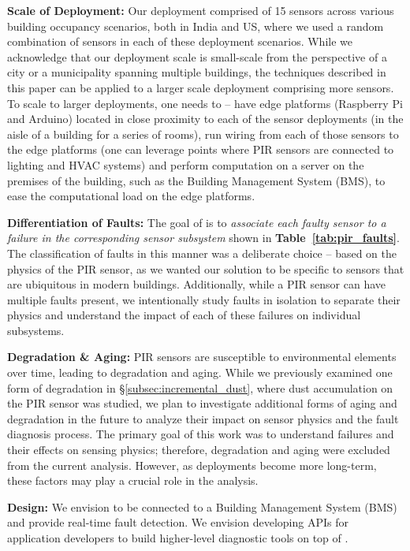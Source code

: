 \noindent \textbf{Scale of Deployment:} Our deployment comprised of 15 sensors across various building occupancy scenarios, both in India and US, where we used a random combination of sensors in each of these deployment scenarios. While we acknowledge that our deployment scale is small-scale from the perspective of a city or a municipality spanning multiple buildings, the techniques described in this paper can be applied to a larger scale deployment comprising more sensors. To scale to larger deployments, one needs to -- \ca have edge platforms (Raspberry Pi and Arduino) located in close proximity to each of the sensor deployments (\eg in the aisle of a building for a series of rooms), \cb run wiring from each of those sensors to the edge platforms (\eg one can leverage points where PIR sensors are connected to lighting and HVAC systems) and \cc perform computation on a server on the premises of the building, such as the Building Management System (BMS), to ease the computational load on the edge platforms.

\noindent \textbf{Differentiation of Faults:} The goal of \sol is to {\em associate each faulty sensor to a failure in the corresponding sensor subsystem} shown in {\bfseries Table~\ref{tab:pir_faults}}. The classification of faults in this manner was a deliberate choice -- based on the physics of the PIR sensor, as we wanted our solution to be specific to sensors that are ubiquitous in modern buildings. Additionally, while a PIR sensor can have multiple faults present, we intentionally study faults in isolation to separate their physics and understand the impact of each of these failures on individual subsystems.

\noindent \textbf{Degradation \& Aging:} PIR sensors are susceptible to environmental elements over time, leading to degradation and aging. While we previously examined one form of degradation in \S\ref{subsec:incremental_dust}, where dust accumulation on the PIR sensor was studied, we plan to investigate additional forms of aging and degradation in the future to analyze their impact on sensor physics and the fault diagnosis process. The primary goal of this work was to understand failures and their effects on sensing physics; therefore, degradation and aging were excluded from the current analysis. However, as deployments become more long-term, these factors may play a crucial role in the analysis.

\noindent\textbf{Design:} We envision \sol to be connected to a Building Management System (BMS) and provide real-time fault detection. We envision developing APIs for application developers to build higher-level diagnostic tools on top of \sol.


